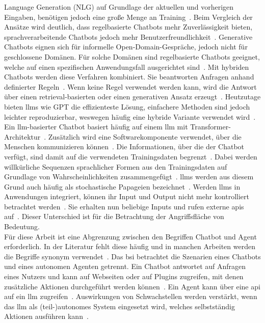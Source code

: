 Language
Generation (NLG) auf Grundlage der aktuellen und vorherigen Eingaben, benötigen jedoch eine große Menge an Training~\cite[10]{cb12}. Beim Vergleich der Ansätze wird 
deutlich, dass regelbasierte Chatbots mehr Zuverlässigkeit bieten, sprachverarbeitende Chatbots jedoch mehr Benutzerfreundlichkeit~\cite[4]{cb04}. Generative Chatbots
eignen sich für informelle Open-Domain-Gespräche, jedoch nicht für geschlossene Domänen. Für solche Domänen sind regelbasierte Chatbots geeignet, welche auf
einen spezifischen Anwendungsfall ausgerichtet sind~\cite[8]{cb11}. Mit hybriden Chatbots werden diese Verfahren kombiniert. Sie beantworten Anfragen anhand
definierter Regeln~\cite[8]{cb11}. Wenn keine Regel verwendet werden kann, wird die Antwort über einen retrieval-basierten oder einen generativen Ansatz erzeugt~\cite[8]{cb11}.
Heutzutage bieten \acp{llm} wie GPT die effizienteste Lösung, einfachere Methoden sind jedoch leichter reproduzierbar, weswegen häufig eine hybride Variante verwendet wird~\cite[104]{cb05}. \\
Ein \ac{llm}-basierter Chatbot basiert häufig auf einem \ac{llm} mit Transformer-Architektur~\cite[87]{cb05}. Zusätzlich wird eine Softwarekomponente
verwendet, über die Menschen kommunizieren können~\cite[87]{cb05}. Die Informationen, über die der Chatbot verfügt, sind damit auf die verwendeten Trainingsdaten
begrenzt~\cite[92]{cb05}. Dabei werden willkürliche Sequenzen sprachlicher Formen aus den Trainingsdaten auf Grundlage von Wahrscheinlichkeiten 
zusammengefügt~\cite[93]{cb05}.
\acp{llm} werden aus diesem Grund auch häufig als stochastische Papageien bezeichnet~\cite[617]{cb14}. Werden \acp{llm} in Anwendungen 
integriert, können ihr
Input und Output nicht mehr kontrolliert betrachtet werden~\cite[13]{cb09}. Sie erhalten nun beliebige Inputs und rufen externe \acp{api} auf~\cite[13]{cb09}. 
Dieser Unterschied ist für die Betrachtung der Angriffsfläche von Bedeutung. \\
Für diese Arbeit ist eine Abgrenzung zwischen den Begriffen Chatbot und Agent erforderlich. In der Literatur fehlt diese häufig und in
manchen Arbeiten werden die Begriffe synonym verwendet~\cite[5]{cb09}. Das \ac{bsi} betrachtet die Szenarien eines Chatbots und eines autonomen Agenten getrennt.
Ein Chatbot antwortet auf Anfragen eines Nutzers und kann auf Webseiten oder auf Plugins zugreifen, 
mit denen zusätzliche Aktionen durchgeführt werden können~\cite[8]{cb02}. Ein Agent kann über eine \ac{api} auf ein \ac{llm} zugreifen~\cite[2]{sm08}.
Auswirkungen von Schwachstellen werden verstärkt, wenn das \ac{llm} als (teil-)autonomes System eingesetzt wird, welches selbstständig Aktionen ausführen kann~\cite[3]{sm08}.
